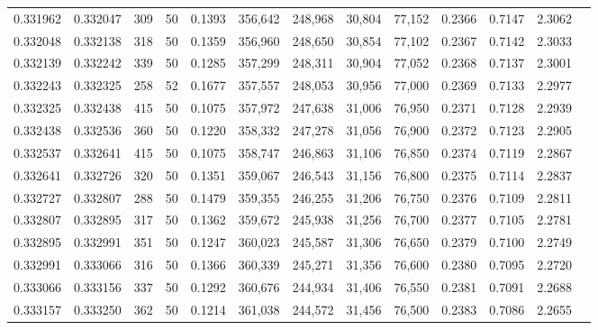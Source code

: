 \begin{tabular}{rrrrrrrrrrrrr}
0.331962 & 0.332047 &   309 &  50 &                                     0.1393 & 356,642 & 248,968 &  30,804 &  77,152 & 0.2366 & 0.7147 & 2.3062 \\
0.332048 & 0.332138 &   318 &  50 &                                     0.1359 & 356,960 & 248,650 &  30,854 &  77,102 & 0.2367 & 0.7142 & 2.3033 \\
0.332139 & 0.332242 &   339 &  50 &                                     0.1285 & 357,299 & 248,311 &  30,904 &  77,052 & 0.2368 & 0.7137 & 2.3001 \\
0.332243 & 0.332325 &   258 &  52 &                                     0.1677 & 357,557 & 248,053 &  30,956 &  77,000 & 0.2369 & 0.7133 & 2.2977 \\
0.332325 & 0.332438 &   415 &  50 &                                     0.1075 & 357,972 & 247,638 &  31,006 &  76,950 & 0.2371 & 0.7128 & 2.2939 \\
0.332438 & 0.332536 &   360 &  50 &                                     0.1220 & 358,332 & 247,278 &  31,056 &  76,900 & 0.2372 & 0.7123 & 2.2905 \\
0.332537 & 0.332641 &   415 &  50 &                                     0.1075 & 358,747 & 246,863 &  31,106 &  76,850 & 0.2374 & 0.7119 & 2.2867 \\
0.332641 & 0.332726 &   320 &  50 &                                     0.1351 & 359,067 & 246,543 &  31,156 &  76,800 & 0.2375 & 0.7114 & 2.2837 \\
0.332727 & 0.332807 &   288 &  50 &                                     0.1479 & 359,355 & 246,255 &  31,206 &  76,750 & 0.2376 & 0.7109 & 2.2811 \\
0.332807 & 0.332895 &   317 &  50 &                                     0.1362 & 359,672 & 245,938 &  31,256 &  76,700 & 0.2377 & 0.7105 & 2.2781 \\
0.332895 & 0.332991 &   351 &  50 &                                     0.1247 & 360,023 & 245,587 &  31,306 &  76,650 & 0.2379 & 0.7100 & 2.2749 \\
0.332991 & 0.333066 &   316 &  50 &                                     0.1366 & 360,339 & 245,271 &  31,356 &  76,600 & 0.2380 & 0.7095 & 2.2720 \\
0.333066 & 0.333156 &   337 &  50 &                                     0.1292 & 360,676 & 244,934 &  31,406 &  76,550 & 0.2381 & 0.7091 & 2.2688 \\
0.333157 & 0.333250 &   362 &  50 &                                     0.1214 & 361,038 & 244,572 &  31,456 &  76,500 & 0.2383 & 0.7086 & 2.2655 \\

\end{tabular}
